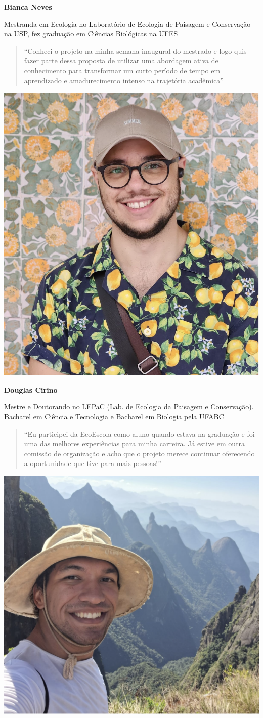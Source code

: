 \documentclass[
]{book}
\begin{document}
\textbf{Bianca Neves}

Mestranda em Ecologia no Laboratório de Ecologia de Paisagem e Conservação na USP, fez graduação em Ciências Biológicas na UFES

\begin{quote}
``Conheci o projeto na minha semana inaugural do mestrado e logo quis fazer parte dessa proposta de utilizar uma abordagem ativa de conhecimento para transformar um curto período de tempo em aprendizado e amadurecimento intenso na trajetória acadêmica''
\end{quote}

\begin{center}\includegraphics[width=0.5\linewidth]{figs/doug_picture} \end{center}

\textbf{Douglas Cirino}

Mestre e Doutorando no LEPaC (Lab. de Ecologia da Paisagem e Conservação). Bacharel em Ciência e Tecnologia e Bacharel em Biologia pela UFABC

\begin{quote}
``Eu participei da EcoEscola como aluno quando estava na graduação e foi uma das melhores experiências para minha carreira. Já estive em outra comissão de organização e acho que o projeto merece continuar oferecendo a oportunidade que tive para mais pessoas!''
\end{quote}

\begin{center}\includegraphics[width=0.5\linewidth]{figs/gabriel_picture} \end{center}
\end{document}
